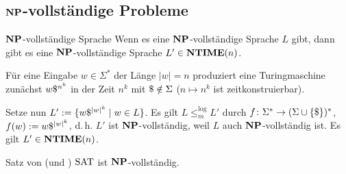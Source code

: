 \subsection{%
    \texorpdfstring{$\mathbf{NP}$}{NP}-vollständige Probleme%
}

\begin{Satz}{$\mathbf{NP}$-vollständige Sprache}
    Wenn es eine $\mathbf{NP}$-vollständige Sprache $L$ gibt,
    dann gibt es eine $\mathbf{NP}$-vollständige Sprache $L' \in \mathbf{NTIME}(n)$.
\end{Satz}

\begin{Beweis}
    Für eine Eingabe $w \in \Sigma^\ast$ der Länge $|w| = n$
    produziert eine Turingmaschine zunächst $w\$^{n^k}$ in der Zeit
    $n^k$ mit $\$ \notin \Sigma$ ($n \mapsto n^k$ ist zeitkonstruierbar).
    
    Setze nun $L' := \{w\$^{|w|^k} \;|\; w \in L\}$.
    Es gilt $L \le_m^{\log} L'$ durch
    $f\colon \Sigma^\ast \rightarrow (\Sigma \cup \{\$\})^\ast$,
    $f(w) := w\$^{|w|^k}$, d.\,h. $L'$ ist $\mathbf{NP}$-vollständig, weil
    $L$ auch $\mathbf{NP}$-vollständig ist.
    Es gilt $L' \in \mathbf{NTIME}(n)$.
\end{Beweis}

\linie

\begin{Satz}{Satz von  (und )}
    $\text{SAT}$ ist $\mathbf{NP}$-vollständig.
\end{Satz}

